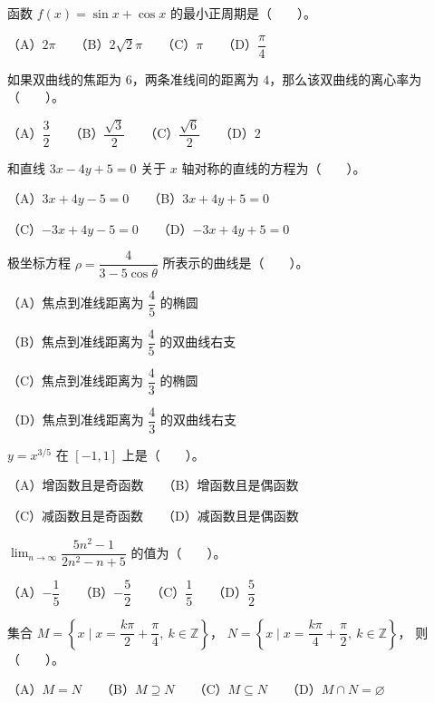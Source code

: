 \begin{question}
函数 $f(x)=\sin x+\cos x$ 的最小正周期是\mbox{（　　）}。

（A）$2\pi$　　（B）$2\sqrt2\pi$　　（C）$\pi$　　（D）$\dfrac\pi4$

\end{question}
\begin{question}
如果双曲线的焦距为 $6$，两条准线间的距离为 $4$，那么该双曲线的离心率为\mbox{（　　）}。

（A）$\dfrac32$　　（B）$\dfrac{\sqrt3}{2}$　　（C）$\dfrac{\sqrt6}{2}$　　（D）$2$

\end{question}
\begin{question}
和直线 $3x-4y+5=0$ 关于 $x$ 轴对称的直线的方程为\mbox{（　　）}。

（A）$3x+4y-5=0$　　（B）$3x+4y+5=0$

（C）$-3x+4y-5=0$　　（D）$-3x+4y+5=0$

\end{question}
\begin{question}
极坐标方程 $\rho=\dfrac4{3-5\cos\theta}$ 所表示的曲线是\mbox{（　　）}。

（A）焦点到准线距离为 $\dfrac45$ 的椭圆

（B）焦点到准线距离为 $\dfrac45$ 的双曲线右支

（C）焦点到准线距离为 $\dfrac43$ 的椭圆

（D）焦点到准线距离为 $\dfrac43$ 的双曲线右支

\end{question}
\begin{question}
$y=x^{3/5}$ 在 $[-1,1]$ 上是\mbox{（　　）}。

（A）增函数且是奇函数　　（B）增函数且是偶函数

（C）减函数且是奇函数　　（D）减函数且是偶函数

\end{question}
\begin{question}
$\displaystyle\lim_{n\to\infty}\dfrac{5n^2-1}{2n^2-n+5}$ 的值为\mbox{（　　）}。

（A）$-\dfrac15$　　（B）$-\dfrac52$　　（C）$\dfrac15$　　（D）$\dfrac52$

\end{question}
\begin{question}
集合
$M=\left\{x\mid x=\dfrac{k\pi}{2}+\dfrac\pi4,\ k\in\mathbb Z\right\}$，
$N=\left\{x\mid x=\dfrac{k\pi}{4}+\dfrac\pi2,\ k\in\mathbb Z\right\}$，
则\mbox{（　　）}。

（A）$M=N$　　（B）$M\supseteq N$　　（C）$M\subseteq N$　　（D）$M\cap N=\varnothing$

\end{question}
